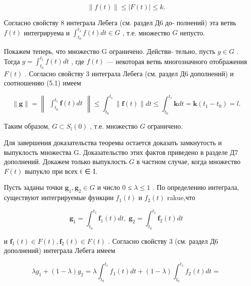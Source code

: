\documentclass[8pt]{extarticle}
\begin{document}
\[
\parallel f\left( t\right) \parallel  \leq  \left| {F\left( t\right) }\right|  \leq  k. \tag{5.1}
\]

Согласно свойству 8 интеграла Лебега (см. раздел Д6 до- полнений) эта ветвь \(f\left( t\right)\) интегрируема и \({\int }_{{t}_{0}}^{{t}_{1}}f\left( t\right) {dt} \in  G\) , т.е. множество \(G\) непусто.

Покажем теперь, что множество G ограничено. Действи- тельно, пусть \(g \in  G\) . Тогда \(g = {\int }_{{t}_{0}}^{{t}_{1}}f\left( t\right) {dt}\) , где \(f\left( t\right)\) — некоторая ветвь многозначного отображения \(F\left( t\right)\) . Согласно свойству 3 интеграла Лебега (см. раздел Д6 дополнений) и соотношению (5.1) имеем

\[
\parallel \mathbf{g}\parallel  = \left\lVert \begin{array}{c} {{\int }_{{t}_{0}}^{{t}_{1}}\mathbf{f}\left( t\right) {dt}} \end{array} \right\rVert \leq  {\int }_{{t}_{0}}^{{t}_{1}}\parallel \mathbf{f}\left( t\right) \parallel {dt} \leq  {\int }_{{t}_{0}}^{{t}_{1}}\mathbf{k}{dt} = \mathbf{k}\left( {{t}_{1} - {t}_{0}}\right)  = l.
\]

Таким образом, \(G \subset  {S}_{l}\left( 0\right)\) , т.е. множество \(G\) ограничено.

Для завершения доказательства теоремы остается доказать замкнутость и выпуклость множества G. Доказательство этих фактов приведено в разделе Д7 дополнений. Докажем только выпуклость \(G\) в частном случае, когда множество \(F\left( t\right)\) выпукло при всех t ∈ I.

Пусть заданы точки \({\mathbf{g}}_{1},{\mathbf{g}}_{2} \in  G\) и число 0 ≤ \(\lambda  \leq  1\) . По определению интеграла, существуют интегрируемые функции \({f}_{1}\left( t\right)\) и \({f}_{2}\left( t\right)\) rakue,что

\[
{\mathbf{g}}_{1} = {\int }_{{t}_{0}}^{{t}_{1}}{\mathbf{f}}_{1}\left( t\right) {dt},\;{\mathbf{g}}_{2} = {\int }_{{t}_{0}}^{{t}_{1}}{\mathbf{f}}_{2}\left( t\right) {dt}
\]

и \({\mathbf{f}}_{1}\left( t\right)  \in  F\left( t\right) ,{\mathbf{f}}_{2}\left( t\right)  \in  F\left( t\right)\) . Согласно свойству 3 (см. раздел Д6 дополнений) интеграла Лебега имеем

\[
\lambda {g}_{1} + \left( {1 - \lambda }\right) {g}_{2} = \lambda {\int }_{{t}_{0}}^{{t}_{1}}{f}_{1}\left( t\right) {dt} + \left( {1 - \lambda }\right) {\int }_{{t}_{0}}^{{t}_{1}}{f}_{2}\left( t\right) {dt} =
\]
\end{document}
